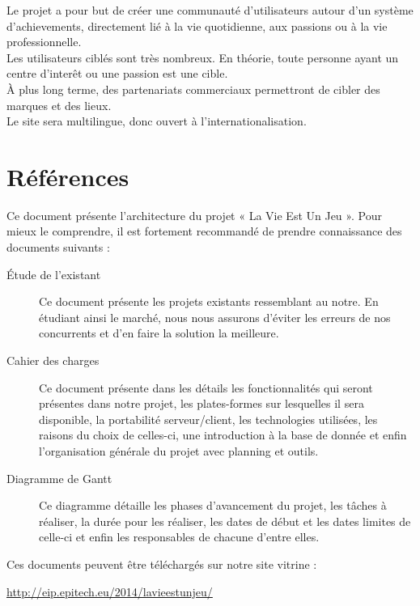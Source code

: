 \documentclass{life-fr}
\begin{document}
Le projet a pour but de créer une communauté d'utilisateurs autour d'un système d'achievements, directement lié à la vie quotidienne, aux passions ou à la vie professionnelle.\\

Les utilisateurs ciblés sont très nombreux. En théorie, toute personne ayant un centre d'interêt ou une passion est une cible.\\

À plus long terme, des partenariats commerciaux permettront de cibler des marques et des lieux.\\

Le site sera multilingue, donc ouvert à l'internationalisation.

\section{Références}

Ce document présente l’architecture du projet « La Vie Est Un Jeu ». Pour mieux le comprendre, il est
fortement recommandé de prendre connaissance des documents suivants :

\begin{description}

  \item[Étude de l’existant]
    Ce document présente les projets existants ressemblant au notre. En étudiant ainsi le marché, nous nous assurons d’éviter les erreurs de nos concurrents et d’en faire la solution la meilleure.

  \item[Cahier des charges]
    Ce document présente dans les détails les fonctionnalités qui seront présentes dans notre projet, les plates-formes sur lesquelles il sera disponible, la portabilité serveur/client, les technologies utilisées, les raisons du choix de celles-ci, une introduction à la base de donnée et enfin l’organisation générale du projet avec planning et outils.
  \item[Diagramme de Gantt]
    Ce diagramme détaille les phases d’avancement du projet, les tâches à réaliser, la durée pour les réaliser, les dates de début et les dates limites de celle-ci et enfin les responsables de chacune d’entre elles.

\end{description}

Ces documents peuvent être téléchargés sur notre site vitrine :

\url{http://eip.epitech.eu/2014/lavieestunjeu/}
\end{document}
